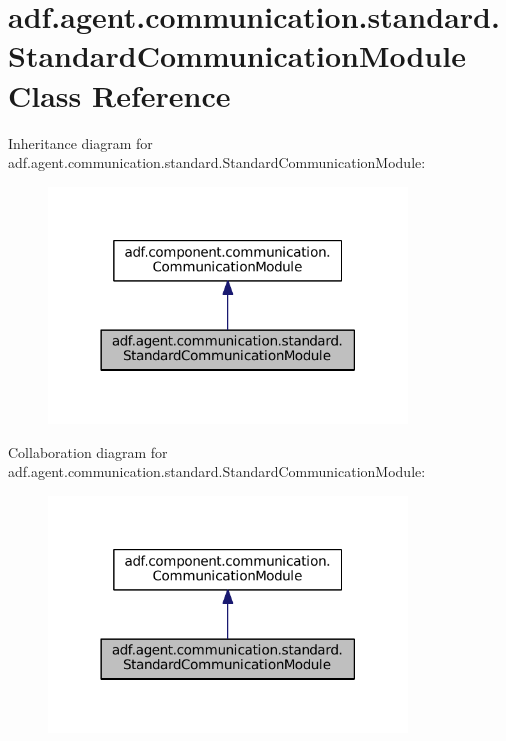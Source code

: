 \hypertarget{classadf_1_1agent_1_1communication_1_1standard_1_1StandardCommunicationModule}{}\section{adf.\+agent.\+communication.\+standard.\+Standard\+Communication\+Module Class Reference}
\label{classadf_1_1agent_1_1communication_1_1standard_1_1StandardCommunicationModule}


Inheritance diagram for adf.\+agent.\+communication.\+standard.\+Standard\+Communication\+Module\+:
\nopagebreak
\begin{figure}[H]
\begin{center}
\leavevmode
\includegraphics[width=270pt]{classadf_1_1agent_1_1communication_1_1standard_1_1StandardCommunicationModule__inherit__graph}
\end{center}
\end{figure}


Collaboration diagram for adf.\+agent.\+communication.\+standard.\+Standard\+Communication\+Module\+:
\nopagebreak
\begin{figure}[H]
\begin{center}
\leavevmode
\includegraphics[width=270pt]{classadf_1_1agent_1_1communication_1_1standard_1_1StandardCommunicationModule__coll__graph}
\end{center}
\end{figure}
